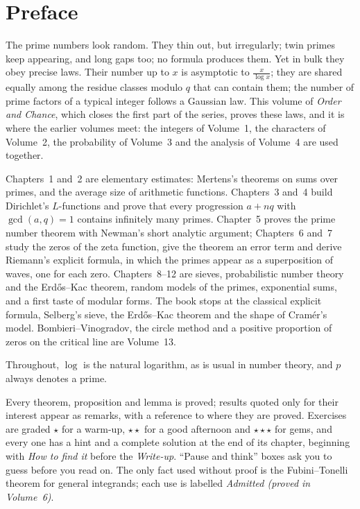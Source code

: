 \chapter*{Preface}
The prime numbers look random. They thin out, but irregularly; twin primes keep appearing, and long gaps too; no
formula produces them. Yet in bulk they obey precise laws. Their number up to $x$ is asymptotic to
$\frac x{\log x}$; they are shared equally among the residue classes modulo $q$ that can contain them; the number of
prime factors of a typical integer follows a Gaussian law. This volume of \emph{Order and Chance}, which closes the
first part of the series, proves these laws, and it is where the earlier volumes meet: the integers of Volume~1, the
characters of Volume~2, the probability of Volume~3 and the analysis of Volume~4 are used together.

Chapters~1 and~2 are elementary estimates: Mertens's theorems on sums over primes, and the average size of
arithmetic functions. Chapters~3 and~4 build Dirichlet's $L$-functions and prove that every progression $a+nq$ with
$\gcd(a,q)=1$ contains infinitely many primes. Chapter~5 proves the prime number theorem with Newman's short analytic
argument; Chapters~6 and~7 study the zeros of the zeta function, give the theorem an error term and derive
Riemann's explicit formula, in which the primes appear as a superposition of waves, one for each zero. Chapters~8--12
are sieves, probabilistic number theory and the Erd\H{o}s--Kac theorem, random models of the primes, exponential sums,
and a first taste of modular forms. The book stops at the classical explicit formula, Selberg's sieve, the Erd\H{o}s--Kac theorem and the shape of Cramér's model. Bombieri--Vinogradov, the circle method and a positive proportion of zeros on the critical line are Volume~13.

Throughout, $\log$ is the natural logarithm, as is usual in number theory, and $p$ always denotes a prime.

Every theorem, proposition and lemma is proved; results quoted only for their interest appear as remarks, with a
reference to where they are proved. Exercises are graded \textbf{$\star$} for a warm-up, \textbf{$\star\star$} for a good
afternoon and \textbf{$\star\star\star$} for gems, and every one has a hint and a complete solution at the end of its
chapter, beginning with \emph{How to find it} before the \emph{Write-up}. ``Pause and think'' boxes ask you to guess
before you read on. The only fact used without proof is the Fubini--Tonelli theorem for general integrands; each use is
labelled \emph{Admitted (proved in Volume~6)}.
